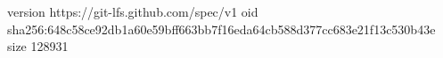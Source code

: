 version https://git-lfs.github.com/spec/v1
oid sha256:648c58ce92db1a60e59bff663bb7f16eda64cb588d377cc683e21f13c530b43e
size 128931

